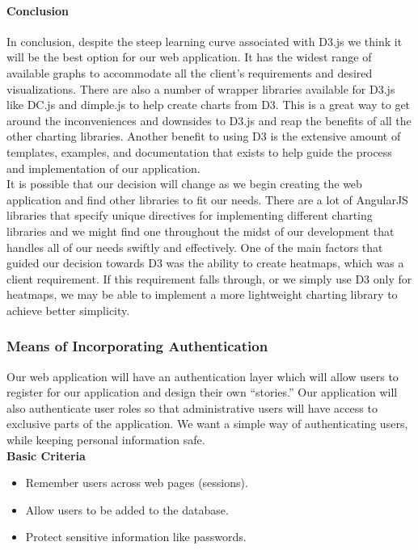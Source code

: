 \paragraph{Conclusion}
In conclusion, despite the steep learning curve associated with D3.js we think it will be the best option for our web application. It has the widest range of available graphs to accommodate all the client's requirements and desired visualizations. There are also a number of wrapper libraries available for D3.js like DC.js and dimple.js to help create charts from D3. This is a great way to get around the inconveniences and downsides to D3.js and reap the benefits of all the other charting libraries. Another benefit to using D3 is the extensive amount of templates, examples, and documentation that exists to help guide the process and implementation of our application.\\
It is possible that our decision will change as we begin creating the web application and find other libraries to fit our needs. There are a lot of AngularJS libraries that specify unique directives for implementing different charting libraries and we might find one throughout the midst of our development that handles all of our needs swiftly and effectively. One of the main factors that guided our decision towards D3 was the ability to create heatmaps, which was a client requirement. If this requirement falls through, or we simply use D3 only for heatmaps, we may be able to implement a more lightweight charting library to achieve better simplicity.
\subsubsection{Means of Incorporating Authentication}
Our web application will have an authentication layer which will allow users to register for our application and design their own ``stories.'' Our application will also authenticate user roles so that administrative users will have access to exclusive parts of the application. We want a simple way of authenticating users, while keeping personal information safe.\\
\textbf{Basic Criteria}
\begin{itemize}
\item Remember users across web pages (sessions). 
\item Allow users to be added to the database. 
\item Protect sensitive information like passwords.
\end{itemize}

